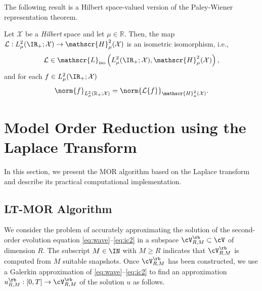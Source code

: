 The following result is a Hilbert space-valued version of the 
Paley-Wiener representation theorem.

\begin{theorem}
\label{thm:paley_wiener}
Let $\mathcal{X}$ be a {\it Hilbert} space and let $\mu \in \mathbb{R}$.
Then, the map 
$
	\mathcal{L}:
	L^2_\mu(\IR_+;\mathcal{X}) 
	\rightarrow 
	\mathscr{H}^{2}_\mu(\mathcal{X})
$
is an isometric isomorphism, i.e., 
\begin{equation}
    \mathcal{L} 
    \in 
    \mathscr{L}_{\normalfont\text{iso}}
    \left(
        L^2_\mu(\IR_+;\mathcal{X}), \mathscr{H}^{2}_\mu(\mathcal{X})
    \right),
\end{equation}
and for each $f \in L^2_\mu(\IR_+;\mathcal{X})$
\begin{equation}\label{eq:norm_equiv}
	\norm{f}_{L^2_\mu\left(\mathbb{R}_+;\mathcal{X}\right)} 
	= 
	\norm{
		\mathcal{L}\{f\}
	}_{\mathscr{H}^{2}_\mu(\mathcal{X})}.
\end{equation}
\end{theorem}

\section{Model Order Reduction using the Laplace Transform}
\label{sec:laplace_transform_MOR}
In this section, we present the MOR algorithm based on the Laplace transform 
and describe its practical computational implementation.

\subsection{LT-MOR Algorithm}

We consider the problem of accurately approximating the solution of the second-order evolution equation \eqref{eq:wave}--\eqref{eq:ic2} in a subspace $\cV_{R,M}^\rb\subset\cV$ of dimension $R$. The subscript $M\in\IN$ with $M\geq R$ indicates that
$\cV_{R,M}^\rb$ is computed from $M$ suitable snapshots.
Once $\cV_{R,M}^\rb$ has been constructed, we use a Galerkin approximation of \eqref{eq:wave}--\eqref{eq:ic2} to find an approximation $u_{R,M}^\rb:[0,T]\to \cV_{R,M}^\rb$ of the solution $u$ as follows.

